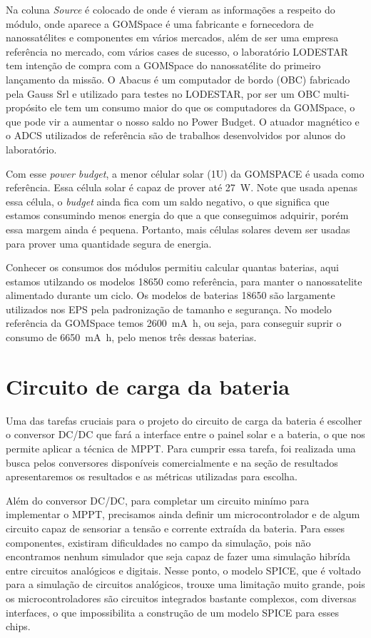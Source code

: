 Na coluna \textit{Source} é colocado de onde é vieram as informações a respeito do módulo, onde aparece a GOMSpace é uma fabricante e fornecedora de nanossatélites e componentes em vários mercados, além de ser uma empresa referência no mercado, com vários cases de sucesso, o laboratório LODESTAR tem intenção de compra com a GOMSpace do nanossatélite do primeiro lançamento da missão. O Abacus é um computador de bordo (OBC) fabricado pela Gauss Srl e utilizado para testes no LODESTAR, por ser um OBC multi-propósito ele tem um consumo maior do que os computadores da GOMSpace, o que pode vir a aumentar o nosso saldo no Power Budget. O atuador magnético \cite{unb_mag_actuator} e o ADCS \cite{carol_adcs} utilizados de referência são de trabalhos desenvolvidos por alunos do laboratório. 


Com esse \textit{power budget}, a menor célular solar (1U) da GOMSPACE é usada como referência. Essa célula solar é capaz de prover até \SI{27}{\watt}. Note que usada apenas essa célula, o \textit{budget} ainda fica com um saldo negativo, o que significa que estamos consumindo menos energia do que a que conseguimos adquirir, porém essa margem ainda é pequena. Portanto, mais células solares devem ser usadas para prover uma quantidade segura de energia.

Conhecer os consumos dos módulos permitiu calcular quantas baterias, aqui estamos utilzando os modelos 18650 como referência, para manter o nanossatelite alimentado durante um ciclo. Os modelos de baterias 18650 são largamente utilizados nos EPS pela padronização de tamanho e segurança. No modelo referência da GOMSpace temos \SI{2600}{\milli\ampere\hour}, ou seja, para conseguir suprir o consumo de \SI{6650}{\milli\ampere\hour}, pelo menos três dessas baterias.

\section{Circuito de carga da bateria}

Uma das tarefas cruciais para o projeto do circuito de carga da bateria é escolher o conversor DC/DC que fará a interface entre o painel solar e a bateria, o que nos permite aplicar a técnica de MPPT. Para cumprir essa tarefa, foi realizada uma busca pelos conversores disponíveis comercialmente e na seção de resultados apresentaremos os resultados e as métricas utilizadas para escolha. 

Além do conversor DC/DC, para completar um circuito minímo para implementar o MPPT, precisamos ainda definir um microcontrolador e de algum circuito capaz de sensoriar a tensão e corrente extraída da bateria. Para esses componentes, existiram dificuldades no campo da simulação, pois não encontramos nenhum simulador que seja capaz de fazer uma simulação hibrída entre circuitos analógicos e digitais. Nesse ponto, o modelo SPICE, que é voltado para a simulação de circuitos analógicos, trouxe uma limitação muito grande, pois os microcontroladores são circuitos integrados bastante complexos, com diversas interfaces, o que impossibilita a construção de um modelo SPICE para esses chips.


